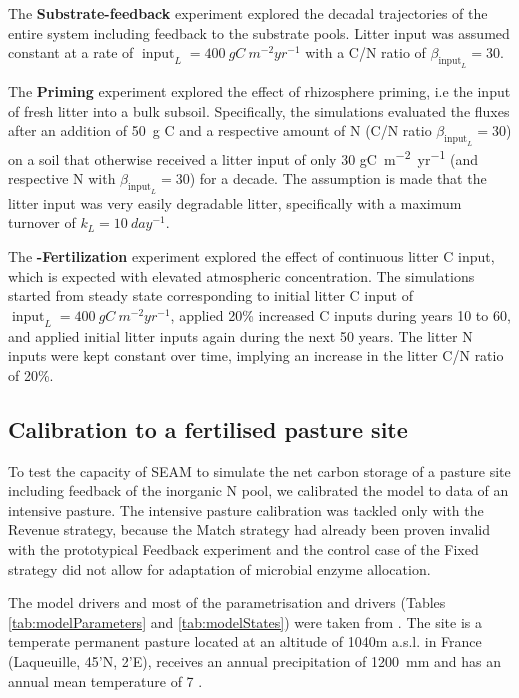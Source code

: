 The \textbf{Substrate-feedback} experiment explored the decadal trajectories
of the entire system including feedback to the substrate pools. Litter input was
assumed constant at a rate of $\operatorname{input}_L =
400~\unit{gC~m^{-2}yr^{-1}}$ with a C/N ratio of $\beta_{\operatorname{input}_L} = 30$.

The \textbf{Priming} experiment explored the effect of rhizosphere priming, i.e
the input of fresh litter into a bulk subsoil. Specifically, the simulations
evaluated the fluxes after an addition of 50~\unit{g} C and a respective amount
of N (C/N ratio $\beta_{\operatorname{input}_L} = 30$) on a soil that otherwise
received a litter input of only 30 \unit{gC~m^{-2}yr^{-1}} (and respective N
with $\beta_{\operatorname{input}_L} = 30$) for a decade. The assumption is made that
the litter input was very easily degradable litter, specifically with a maximum
turnover of $k_L = 10~\unit{day^{-1}}$.

The \textbf{-Fertilization} experiment explored the effect of
continuous  litter C input, which is expected with elevated atmospheric
 concentration.
The simulations started from steady state corresponding to initial litter C
input of $\operatorname{input}_L = 400~\unit{gC~m^{-2}yr^{-1}}$, applied 20\%
increased C inputs during years 10 to 60, and applied initial litter inputs
again during the next 50 years. The litter N inputs were kept constant over
time, implying an increase in the litter C/N ratio of 20\%.

\subsection{Calibration to a fertilised pasture site}
\label{sec:methodsPasture}

To test the capacity of SEAM to simulate the net carbon storage of a
pasture site including feedback of the inorganic N pool, we calibrated the
model to data of an intensive pasture. The intensive
pasture calibration was tackled only with the Revenue strategy, because the
Match strategy had already been proven invalid with the prototypical Feedback
experiment and the control case of the Fixed strategy did not allow for adaptation
of microbial enzyme allocation.

The model drivers and most of the parametrisation and drivers (Tables
\ref{tab:modelParameters} and \ref{tab:modelStates}) were taken from
\citet{Perveen14}.
The site is a temperate permanent pasture located at an altitude of 1040m
a.s.l. in France (Laqueuille, 45'N, 2'E), receives
an annual precipitation of 1200~mm and has an annual mean temperature of  7
.

